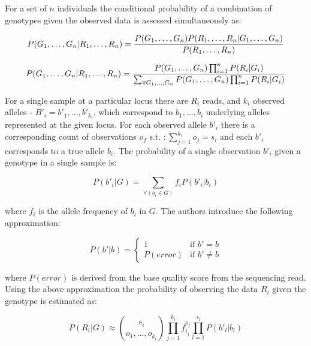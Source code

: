 For a set of $n$ individuals the conditional probability of a combination of genotypes given the observed data is assessed simultaneously as:

\begin{equation}
P(G_1,\ldots,G_n|R_1,\ldots,R_n) 
= { P(G_1,\ldots,G_n) P(R_1,\ldots,R_n|G_1,\ldots,G_n) \over P(R_1,\ldots,R_n)} \\
\end{equation}

\begin{equation}
\label{eq:freebayes_main_model}
P(G_1,\ldots,G_n|R_1,\ldots,R_n) = { P(G_1,\ldots,G_n) \prod_{i=1}^n P(R_i|G_i) \over 
\sum_{\forall{G_1,\ldots,G_n}}  P(G_1,\ldots,G_n) \prod_{i=1}^n P(R_i|G_i) }
\end{equation}
    
For a single sample at a particular locus there are $R_i$ reads, and $k_i$ observed alleles - $B'_i = b'_1,\ldots,b'_{k_i}$, which correspond to $b_1,\ldots,b_i$ underlying alleles represented at the given locus. For each observed allele $b'_i$ there is a corresponding count of observations $o_f$ s.t. $: \sum_{j=1}^{k_i} o_j = s_i$ and each $b'_i$ corresponds to a true allele $b_i$. The probability of a single observation $b'_i$ given a genotype in a single sample is:

\begin{equation}
P(b'_i|G) = \sum_{\forall(b_i \in G)} { f_i P(b'_i|b_i) }
\end{equation}

where $f_i$ is the allele frequency of $b_i$ in $G$. The authors introduce the following approximation:


\begin{equation}
P(b'|b) = 
\left\{
        \begin{array}{ll}
                1 & \mbox{if } b' = b \\
                P(error) & \mbox{if } b' \neq b
        \end{array}
\right.
\end{equation}

where $P(error)$ is derived from the base quality score from the sequencing read. Using the above approximation the probability of observing the data $R_i$ given the genotype is estimated as:

\begin{equation}
P(R_i|G) \approx {s_i \choose o_1,\ldots,o_{k_i} } 
\prod_{j=1}^{k_i} { f_{i_j}^{o_j} }
\prod_{l=1}^{s_i} { P(b'_l | b_l) }
\end{equation}

